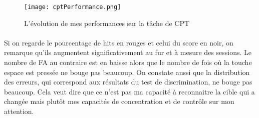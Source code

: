 \begin{figure}[H]
    \begin{center}
    \texttt{[image: cptPerformance.png]}
    \end{center}
    \caption{L'évolution de mes performances sur la tâche de CPT}
\label{CptPerformance}
\end{figure}

\paragraph{}Si on regarde le pourcentage de hits en rouges et celui du score en noir, on remarque qu'ils augmentent significativement au fur et à mesure des sessions. Le nombre de FA
au contraire est en baisse alors que le nombre de fois où la touche espace est pressée ne bouge pas beaucoup. On constate aussi que la distribution des erreurs, qui correspond aux
résultats du test de discrimination, ne bouge pas beaucoup. Cela veut dire que ce n'est pas ma capacité à reconnaitre la cible qui a changée mais plutôt mes capacités de concentration
et de contrôle sur mon attention.